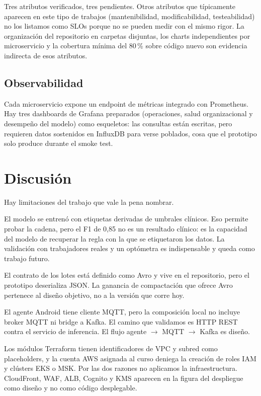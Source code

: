 \documentclass[conference]{IEEEtran}
\begin{document}
Tres atributos verificados, tres pendientes. Otros atributos que 
típicamente aparecen en este tipo de trabajos (mantenibilidad, 
modificabilidad, testeabilidad) no los listamos como SLOs porque 
no se pueden medir con el mismo rigor. La organización del 
repositorio en carpetas disjuntas, los charts independientes por 
microservicio y la cobertura mínima del 80\,\% sobre código nuevo 
son evidencia indirecta de esos atributos.

\subsection{Observabilidad}

Cada microservicio expone un endpoint de métricas integrado con 
Prometheus. Hay tres dashboards de Grafana preparados (operaciones, 
salud organizacional y desempeño del modelo) como esqueletos: las 
consultas están escritas, pero requieren datos sostenidos en 
InfluxDB para verse poblados, cosa que el prototipo solo produce 
durante el smoke test.

\FloatBarrier
\section{Discusión}\label{sec:discusion}

Hay limitaciones del trabajo que vale la pena nombrar.

El modelo se entrenó con etiquetas derivadas de umbrales clínicos. 
Eso permite probar la cadena, pero el F1 de 0,85 no es un resultado 
clínico: es la capacidad del modelo de recuperar la regla con la 
que se etiquetaron los datos. La validación con trabajadores reales 
y un optómetra es indispensable y queda como trabajo futuro.

El contrato de los lotes está definido como Avro y vive en el 
repositorio, pero el prototipo deserializa JSON. La ganancia de 
compactación que ofrece Avro pertenece al diseño objetivo, no a la 
versión que corre hoy.

El agente Android tiene cliente MQTT, pero la composición local 
no incluye broker MQTT ni bridge a Kafka. El camino que validamos 
es HTTP REST contra el servicio de inferencia. El flujo agente 
$\rightarrow$ MQTT $\rightarrow$ Kafka es diseño.

Los módulos Terraform tienen identificadores de VPC y subred como 
placeholders, y la cuenta AWS asignada al curso deniega la creación 
de roles IAM y clústers EKS o MSK. Por las dos razones no aplicamos 
la infraestructura. CloudFront, WAF, ALB, Cognito y KMS aparecen 
en la figura del despliegue como diseño y no como código 
desplegable.
\end{document}
